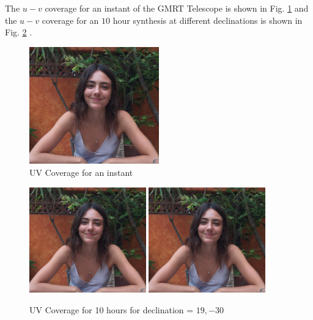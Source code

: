 The $u-v$ coverage for an instant of the GMRT Telescope is shown in Fig. \ref{fig:uvcoverage1} and the $u-v$ coverage for an $10$ hour synthesis at different declinations is shown in Fig. \ref{fig:uvcoverage2} .

\begin{figure}[!htbp]
	\centering \vspace{-0.1in}
	\includegraphics[width=0.5\textwidth]{images/uv-coverage-12.png}	
	\caption[UV Coverage for an instant]{\small UV Coverage for an instant \footnotemark}
	\label{fig:uvcoverage1}
\end{figure}
\begin{figure}[htp]
	\centering \vspace{-0.1in}
	\includegraphics[width=0.45\textwidth]{images/11_1.png}	\hfill
	\includegraphics[width=0.45\textwidth]{images/11_2.png}	
	 \caption[UV Coverage for a few hours]{\small UV Coverage for 10 hours for declination = $19,-30$ \footnotemark}
	\label{fig:uvcoverage2}
\end{figure}



